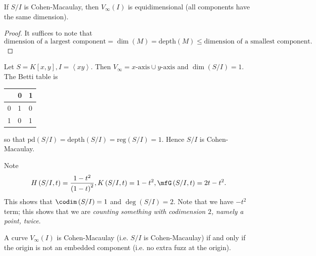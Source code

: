 \documentclass[co439]{subfiles}
\begin{document}
    \begin{prop}{}
        If $S /I$ is Cohen-Macaulay, then $V_{\infty}\left( I \right)$ is equidimensional (all components have the same dimension).
    \end{prop}

    \begin{proof}
        It suffices to note that
        \begin{equation*}
            \text{dimension of a largest component} = \dim\left( M \right) = \text{depth}\left( M \right) \leq \text{dimension of a smallest component}.
        \end{equation*}
    \end{proof}

    \begin{example}{}
        Let $S=K\left[ x,y \right], I=\left< xy \right>$. Then $V_{\infty} = \text{$x$-axis}\cup\text{$y$-axis}$ and $\dim\left( S /I \right) = 1$. The Betti table is

        \noindent
        \begin{center}
            \begin{tabularx}{6cm}{|X|XX|}
                  \hline
                  & 0 & 1 \\
                  \hline
                0 & 1 & 0 \\
                1 & 0 & 1 \\
                  \hline
            \end{tabularx} 
        \end{center}

        \noindent
        so that $\text{pd}\left( S /I \right) = \text{depth}\left( S /I \right) = \text{reg}\left( S /I \right) = 1$. Hence $S /I$ is Cohen-Macaulay. 

        Note
        \begin{equation*}
            H\left( S /I, t \right) = \frac{1-t^{2}}{\left( 1-t \right)^{2}} ,K\left( S /I, t \right)  = 1-t^{2} ,\mfG\left( S /I, t \right)  = 2t-t^{2}.
        \end{equation*}
        This shows that $\codim\left( S /I \right) = 1$ and $\deg\left( S /I \right) = 2$. Note that we have $-t^{2}$ term; this shows that we are \textit{counting something with codimension $2$, namely a point, twice}.
    \end{example}

    \rruleline

    \clearpage

    \begin{prop}{}
        A curve $V_{\infty}\left( I \right)$ is Cohen-Macaulay (i.e. $S /I$ is Cohen-Macaulay) if and only if the origin is not an embedded component (i.e. no extra fuzz at the origin).
    \end{prop}
\end{document}

